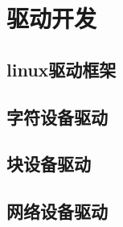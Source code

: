 \chapter{驱动开发}

\section{linux驱动框架}



\section{字符设备驱动}




\section{块设备驱动}



\section{网络设备驱动}




